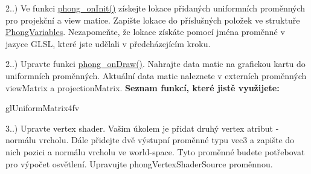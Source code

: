 \begin{DoxyRefList}
2..) Ve funkci \hyperlink{student_8h_ac2adb2ba4e748239b9db4d037584d3cc}{phong\-\_\-on\-Init()} získejte lokace přidaných uniformních proměnných pro projekční a view matice. Zapište lokace do příslušných položek ve struktuře \hyperlink{structPhongVariables}{Phong\-Variables}. Nezapomeňte, že lokace získáte pomocí jména proměnné v jazyce G\-L\-S\-L, které jste udělali v předcházejícím kroku. 

2..) Upravte funkci \hyperlink{student_8h_a53ffbb1a271d285abdaf7a029192f47e}{phong\-\_\-on\-Draw()}. Nahrajte data matic na grafickou kartu do uniformních proměnných. Aktuální data matic naleznete v externích proměnných view\-Matrix a projection\-Matrix. {\bfseries Seznam funkcí, které jistě využijete\-:}
\begin{DoxyItemize}
\item gl\-Uniform\-Matrix4fv  
\end{DoxyItemize}
\item[\label{todo__todo000002}%
\hypertarget{todo__todo000002}{}%
Group \hyperlink{group__task3}{task3} ]3..) Upravte vertex shader. Vašim úkolem je přidat druhý vertex atribut -\/ normálu vrcholu. Dále přidejte dvě výstupní proměnné typu vec3 a zapište do nich pozici a normálu vrcholu ve world-\/space. Tyto proměnné budete potřebovat pro výpočet osvětlení. Upravujte phong\-Vertex\-Shader\-Source proměnnou. 


\end{DoxyRefList}
